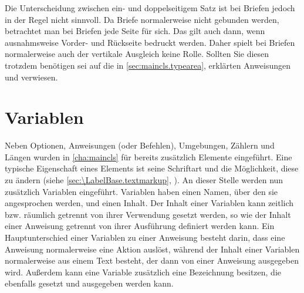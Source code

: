 


Die Unterscheidung zwischen ein- und doppelseitigem Satz ist bei Briefen
jedoch in der Regel nicht sinnvoll. Da Briefe normalerweise nicht gebunden
werden, betrachtet man bei Briefen jede Seite für sich. Das gilt auch dann,
wenn ausnahmsweise Vorder- und Rückseite bedruckt werden. Daher spielt bei
Briefen normalerweise auch der vertikale Ausgleich keine Rolle. Sollten Sie
diesen trotzdem benötigen
\iffalse%
oder wissen wollen, was das ist, %
\fi%
sei auf die in \autoref{sec:maincls.typearea},
 erklärten Anweisungen
 und
 verwiesen.%
%
\EndIndexGroup


\section{Variablen}
%
\BeginIndexGroup
{}%

Neben Optionen, Anweisungen (oder Befehlen), Umgebungen, Zählern und Längen
wurden in \autoref{cha:maincls} für \KOMAScript{} bereits zusätzlich Elemente
eingeführt.  Eine typische Eigenschaft eines Elements ist seine Schriftart und
die Möglichkeit, diese zu ändern (siehe \autoref{sec:\LabelBase.textmarkup},
).  An dieser Stelle werden nun
zusätzlich Variablen eingeführt. Variablen haben einen
Namen, über den sie angesprochen werden,
und einen Inhalt. Der Inhalt einer
Variablen kann zeitlich bzw. räumlich getrennt von ihrer Verwendung gesetzt
werden, so wie der Inhalt einer Anweisung getrennt von ihrer Ausführung
definiert werden kann. Ein Hauptunterschied einer Variablen zu einer Anweisung
besteht darin, dass eine Anweisung normalerweise eine Aktion auslöst, während
der Inhalt einer Variablen normalerweise aus einem Text besteht, der dann von
einer Anweisung ausgegeben wird. Außerdem kann eine Variable zusätzlich eine
Bezeichnung besitzen, die
ebenfalls gesetzt und ausgegeben werden kann.

